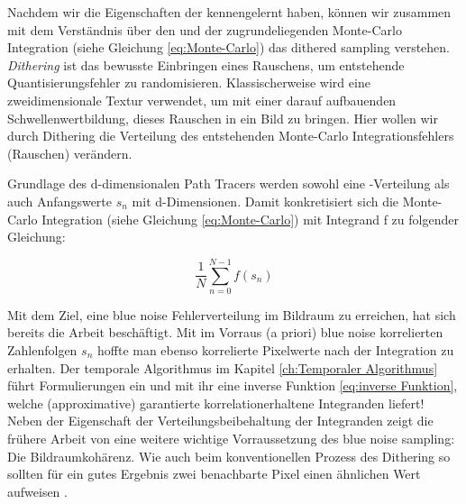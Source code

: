 \label{subsec:dither sampling}
Nachdem wir die Eigenschaften der  kennengelernt haben,
können wir zusammen mit dem Verständnis über den  und der 
zugrundeliegenden Monte-Carlo Integration (siehe Gleichung \ref{eq:Monte-Carlo}) das \glqq dithered sampling\grqq{} verstehen.
\textit{Dithering} ist das bewusste Einbringen eines Rauschens, um entstehende Quantisierungsfehler zu randomisieren.
Klassischerweise wird eine zweidimensionale  Textur verwendet, um mit einer darauf aufbauenden Schwellenwertbildung,
dieses Rauschen in ein Bild zu bringen. Hier wollen wir durch Dithering die Verteilung des entstehenden Monte-Carlo Integrationsfehlers (Rauschen) verändern.\par
Grundlage des d-dimensionalen Path Tracers werden sowohl eine -Verteilung als auch Anfangswerte $s_{n}$ mit d-Dimensionen.
Damit konkretisiert sich die Monte-Carlo Integration (siehe Gleichung \ref{eq:Monte-Carlo}) mit Integrand f zu folgender Gleichung:

\begin{equation}\label{eq:concreteMonteCarlo}
    \frac{1}{N}\sum_{n=0}^{N-1}f(s_{n})
\end{equation}

Mit dem Ziel, eine blue noise Fehlerverteilung im Bildraum zu erreichen, hat sich bereits die Arbeit \cite{georgiev2016blue} beschäftigt. 
Mit im Vorraus (\glqq a priori\grqq{}) blue noise korrelierten Zahlenfolgen $s_{n}$ hoffte man ebenso korrelierte Pixelwerte nach 
der Integration zu erhalten. Der temporale Algorithmus im Kapitel \ref{ch:Temporaler Algorithmus} führt 
Formulierungen ein und mit ihr eine inverse Funktion \ref{eq:inverse Funktion}, welche (approximative) garantierte korrelationerhaltene Integranden liefert!  
Neben der Eigenschaft der Verteilungsbeibehaltung der Integranden zeigt die frühere Arbeit von \cite[Seite 3]{hal02158423} eine weitere wichtige Vorraussetzung 
des blue noise sampling: Die Bildraumkohärenz. Wie auch beim konventionellen Prozess des Dithering so sollten für ein gutes Ergebnis zwei benachbarte 
Pixel einen ähnlichen Wert aufweisen \cite{3288}.




